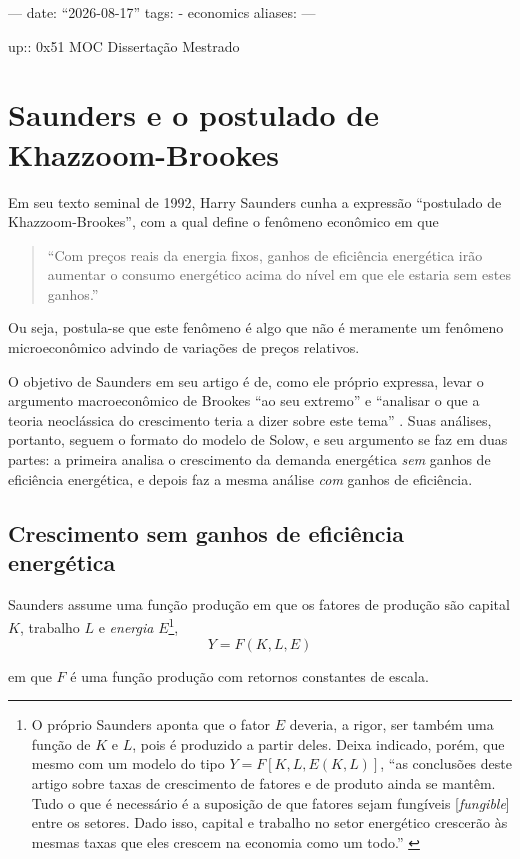 ---
date: ``2026-08-17''
tags:
  - economics
aliases:
---

up:: 0x51 MOC Dissertação Mestrado

\section{Saunders e o postulado de Khazzoom-Brookes}
Em seu texto seminal de 1992, Harry Saunders cunha a expressão ``postulado de Khazzoom-Brookes'', com a qual define o fenômeno econômico em que
\begin{quote}
``Com preços reais da energia fixos, ganhos de eficiência energética irão aumentar o consumo energético acima do nível em que ele estaria sem estes ganhos.'' \parencite[p. 135]{Saunders1992}
\end{quote}

Ou seja, postula-se que este fenômeno é algo que não é meramente um fenômeno microeconômico advindo de variações de preços relativos. 

O objetivo de Saunders em seu artigo é de, como ele próprio expressa, levar o argumento macroeconômico de Brookes ``ao seu extremo'' e ``analisar o que a teoria neoclássica do crescimento teria a dizer sobre este tema'' \parencite[p. 132]{Saunders1992}. Suas análises, portanto, seguem o formato do modelo de Solow, e seu argumento se faz em duas partes: a primeira analisa o crescimento da demanda energética \textit{sem} ganhos de eficiência energética, e depois faz a mesma análise \textit{com} ganhos de eficiência. 

\subsection{Crescimento sem ganhos de eficiência energética}
Saunders assume uma função produção em que os fatores de produção são capital $K$, trabalho $L$ e \textit{energia} $E$\footnote{O próprio Saunders aponta que o fator $E$ deveria, a rigor, ser também uma função de $K$ e $L$, pois é produzido a partir deles. Deixa indicado, porém, que mesmo com um modelo do tipo $Y=F[K, L, E(K,L)]$, ``as conclusões deste artigo sobre taxas de crescimento de fatores e de produto ainda se mantêm. Tudo o que é necessário é a suposição de que fatores sejam fungíveis [\textit{fungible}] entre os setores. Dado isso, capital e trabalho no setor energético crescerão às mesmas taxas que eles crescem na economia como um todo.'' \parencite[p. 144, n.  1]{Saunders1992} },
$$
Y=F(K, L, E)
$$

em que $F$ é uma função produção com retornos constantes de escala. 

